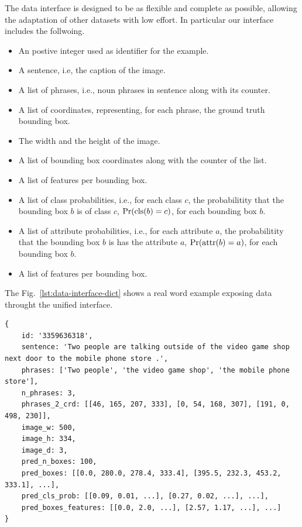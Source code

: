The data interface is designed to be as flexible and complete as
possible, allowing the adaptation of other datasets with low effort.
In particular our interface includes the follwoing.

\begin{itemize}
  \item An postive integer used as identifier for the example.
  \item A sentence, i.e, the caption of the image.
  \item A list of phrases, i.e., noun phrases in sentence along with
  its counter.
  \item A list of coordinates, representing, for each phrase, the
  ground truth bounding box.
  \item The width and the height of the image.
  \item A list of bounding box coordinates along with the counter of
  the list.
  \item A list of features per bounding box.
  \item A list of class probabilities, i.e., for each class $c$, the
  probabilitity that the bounding box $b$ is of class $c$, $\Pr(\text{cls}(b)
  = c)$, for each bounding box $b$.
  \item A list of attribute probabilities, i.e., for each attribute
  $a$, the probabilitity that the bounding box $b$ is has the
  attribute $a$, $\Pr(\text{attr}(b) = a)$, for each bounding box $b$.
  \item A list of features per bounding box.
\end{itemize}

The Fig.~\ref{lst:data-interface-dict} shows a real word example
exposing data throught the unified interface.

\begin{lstlisting}[style=simplepython,caption=TODO,label={lst:data-interface-dict}]
{
    id: '3359636318', 
    sentence: 'Two people are talking outside of the video game shop next door to the mobile phone store .', 
    phrases: ['Two people', 'the video game shop', 'the mobile phone store'], 
    n_phrases: 3, 
    phrases_2_crd: [[46, 165, 207, 333], [0, 54, 168, 307], [191, 0, 498, 230]], 
    image_w: 500, 
    image_h: 334, 
    image_d: 3, 
    pred_n_boxes: 100, 
    pred_boxes: [[0.0, 280.0, 278.4, 333.4], [395.5, 232.3, 453.2, 333.1], ...], 
    pred_cls_prob: [[0.09, 0.01, ...], [0.27, 0.02, ...], ...],
    pred_boxes_features: [[0.0, 2.0, ...], [2.57, 1.17, ...], ...]
}
\end{lstlisting}


